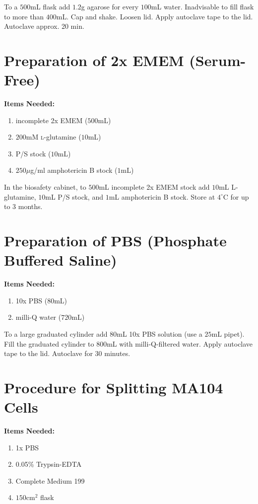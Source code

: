 To a $500$mL flask add $1.2$g agarose for every $100$mL water. Inadvisable to fill flask to more than $400$mL. Cap and shake. Loosen lid. Apply autoclave tape to the lid. Autoclave approx. 20 min.

\section{Preparation of 2x EMEM (Serum-Free)}

{\bfseries Items Needed:} \begin{enumerate}
	\item incomplete 2x EMEM ($500$mL)
	\item $200$mM \textsc{l}-glutamine ($10$mL)
	\item P/S stock ($10$mL)
	\item $250\mu$g/ml amphotericin B stock ($1$mL)
\end{enumerate}

In the biosafety cabinet, to $500$mL incomplete 2x EMEM stock add $10$mL \textsc{L}-glutamine, $10$mL P/S stock, and $1$mL amphotericin B stock. Store at $4^{\circ}$C for up to 3 months.

\section{Preparation of PBS (Phosphate Buffered Saline)}

{\bfseries Items Needed:} \begin{enumerate}
	\item 10x PBS ($80$mL)
	\item milli-Q water ($720$mL)
\end{enumerate}

To a large graduated cylinder add $80$mL 10x PBS solution (use a $25$mL pipet). Fill the graduated cylinder to $800$mL with milli-Q-filtered water. Apply autoclave tape to the lid. Autoclave for 30 minutes.

\section{Procedure for Splitting MA104 Cells}

{\bfseries Items Needed:} \begin{enumerate}
	\item 1x PBS
	\item 0.05\% Trypsin-EDTA
	\item Complete Medium 199
	\item $150$cm$^2$ flask
\end{enumerate}

